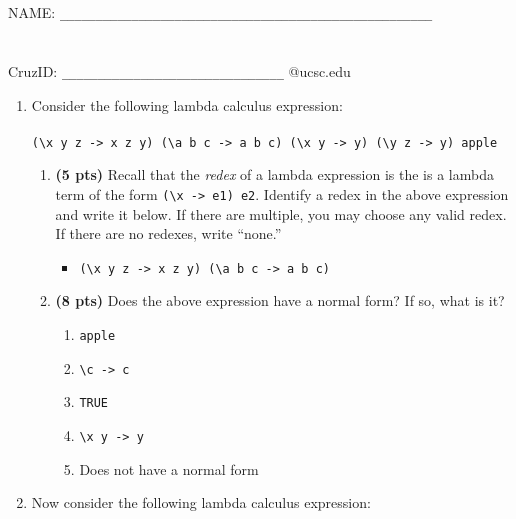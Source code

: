 \documentclass[paper=letter, fontsize=13pt]{article} %
\numberwithin{equation}{section} %
\newif\ifshowanswers\showanswerstrue
\begin{document}
\bigskip
\bigskip
\bigskip
\bigskip
\bigskip
\bigskip
\bigskip
\bigskip
\bigskip
\bigskip
\bigskip
\bigskip
\bigskip
\bigskip
\bigskip
\bigskip
\noindent NAME: \verb|____________________________________________________| \\
\bigskip\\ 
\bigskip\\
CruzID: \verb|_______________________________| @ucsc.edu

\newpage
{}

\bigskip

\begin{enumerate} 
\item Consider the following lambda calculus expression: \\\\

{\Large
\verb|(\x y z -> x z y) (\a b c -> a b c) (\x y -> y) (\y z -> y) apple|
}
\bigskip
\bigskip
\begin{enumerate}[label=(\Alph*)]
\item \textbf{(5 pts)}
  Recall that the \emph{redex} of a lambda expression is the is a lambda term of the form \verb|(\x -> e1) e2|.
  Identify a redex in the above expression and write it below.  If there are multiple, you may choose any valid redex.  If
  there are no redexes, write ``none.''

\ifshowanswers
\begin{itemize}
  \item \verb|(\x y z -> x z y) (\a b c -> a b c)|
\end{itemize}
\else
\bigskip
\bigskip
\bigskip
\bigskip
\bigskip
\bigskip
\bigskip
\bigskip
\bigskip
\bigskip
\bigskip
\bigskip
\bigskip
\fi

\item \textbf{(8 pts)} Does the above expression have a normal form?  If so, what is it?
\begin{enumerate}[label=(\alph*), itemsep=1em]
\item \verb|apple|
\item \verb|\c -> c|
\item \verb|TRUE|
\item \verb|\x y -> y|                  %
\item Does not have a normal form
\end{enumerate}
\end{enumerate}

\newpage
\item Now consider the following lambda calculus expression: \\\\


\end{enumerate}
\end{document}
